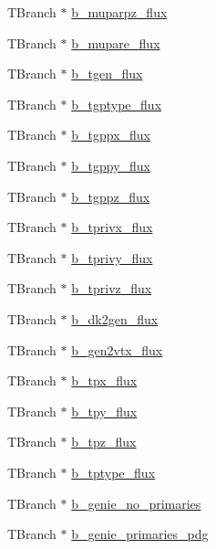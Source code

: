 \begin{DoxyCompactItemize}
\item 
T\-Branch $\ast$ \hyperlink{classanatree_a7e4a4ffff35ec4de18a4f1377f1eec62}{b\-\_\-muparpz\-\_\-flux}
\item 
T\-Branch $\ast$ \hyperlink{classanatree_a4a2c741634b458071456b19322282e1d}{b\-\_\-mupare\-\_\-flux}
\item 
T\-Branch $\ast$ \hyperlink{classanatree_a0f289990b052dbcdc40dd6d1ea5798a7}{b\-\_\-tgen\-\_\-flux}
\item 
T\-Branch $\ast$ \hyperlink{classanatree_abe888fba3e001ec0a569575edf1c7cf9}{b\-\_\-tgptype\-\_\-flux}
\item 
T\-Branch $\ast$ \hyperlink{classanatree_a16323472ae6246ffa02bc96feac7b1a1}{b\-\_\-tgppx\-\_\-flux}
\item 
T\-Branch $\ast$ \hyperlink{classanatree_a29ce4d270eab89919ec6726c15decdac}{b\-\_\-tgppy\-\_\-flux}
\item 
T\-Branch $\ast$ \hyperlink{classanatree_a9e71eb8b68982c74946405cc35db78e0}{b\-\_\-tgppz\-\_\-flux}
\item 
T\-Branch $\ast$ \hyperlink{classanatree_a67ed577b9a051892728d26ee32b830d9}{b\-\_\-tprivx\-\_\-flux}
\item 
T\-Branch $\ast$ \hyperlink{classanatree_a4a517313a9a9c2a855d1eb2d5e4b0325}{b\-\_\-tprivy\-\_\-flux}
\item 
T\-Branch $\ast$ \hyperlink{classanatree_a48e6e6429fccc1b953f1a3c8acfb6c55}{b\-\_\-tprivz\-\_\-flux}
\item 
T\-Branch $\ast$ \hyperlink{classanatree_a5469514a924ef658f47633d33036b1b7}{b\-\_\-dk2gen\-\_\-flux}
\item 
T\-Branch $\ast$ \hyperlink{classanatree_a2296fab8dc0c2d1e7d0ee710d2882fd0}{b\-\_\-gen2vtx\-\_\-flux}
\item 
T\-Branch $\ast$ \hyperlink{classanatree_ae69a91152a16a0a67aa668f31646dcb3}{b\-\_\-tpx\-\_\-flux}
\item 
T\-Branch $\ast$ \hyperlink{classanatree_a942d09465dd88e086c861c0c939b89ad}{b\-\_\-tpy\-\_\-flux}
\item 
T\-Branch $\ast$ \hyperlink{classanatree_a26395edd0c113d77708a2280adb7cc04}{b\-\_\-tpz\-\_\-flux}
\item 
T\-Branch $\ast$ \hyperlink{classanatree_ad6eb89bc66c3d4513a8e9f2b2b660288}{b\-\_\-tptype\-\_\-flux}
\item 
T\-Branch $\ast$ \hyperlink{classanatree_a743aeb64ffacd746a1092ab0c977fb7b}{b\-\_\-genie\-\_\-no\-\_\-primaries}
\item 
T\-Branch $\ast$ \hyperlink{classanatree_ae244d4ab7cf75479fa6b0d55361e730e}{b\-\_\-genie\-\_\-primaries\-\_\-pdg}

\end{DoxyCompactItemize}

